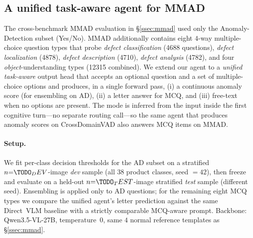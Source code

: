 
\subsection{A unified task-aware agent for MMAD}
\label{ssec:mmad_fulltype}

The cross-benchmark MMAD evaluation in \S\ref{ssec:mmad} used only the
Anomaly-Detection subset (Yes/No). MMAD additionally contains eight
$4$-way multiple-choice question types that probe \emph{defect
classification} (\num{4688} questions), \emph{defect localization}
(\num{4878}), \emph{defect description} (\num{4710}), \emph{defect
analysis} (\num{4782}), and four \emph{object}-understanding types
(\num{12315} combined). We extend our agent to a \emph{unified
task-aware} output head that accepts an optional question and a set of
multiple-choice options and produces, in a single forward pass, (i) a
continuous anomaly score (for ensembling on AD), (ii) a letter answer
for MCQ, and (iii) free-text when no options are present. The mode is
inferred from the input inside the first cognitive turn---no separate
routing call---so the same agent that produces anomaly scores on
CrossDomainVAD also answers MCQ items on MMAD.

\paragraph{Setup.}
We fit per-class decision thresholds for the AD subset on a
stratified $n{=}\TODO_DEV$-image \emph{dev} sample (all 38 product
classes, seed $= 42$), then freeze and evaluate on a held-out
$n{=}\TODO_TEST$-image stratified \emph{test} sample (different seed).
Ensembling is applied only to AD questions; for the remaining eight
MCQ types we compare the unified agent's letter prediction against
the same Direct~VLM baseline with a strictly comparable MCQ-aware
prompt. Backbone: Qwen3.5-VL-27B, temperature~$0$, same $4$ normal
reference templates as \S\ref{ssec:mmad}.

